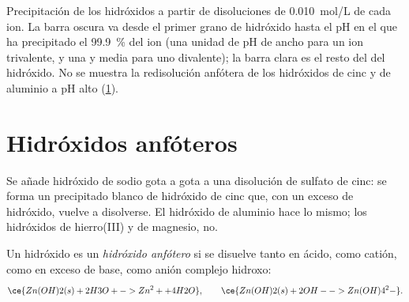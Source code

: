 \begin{omfigure}

{\small Precipitación de los hidróxidos a partir de disoluciones de
\qty{0.010}{mol/L} de cada ion. La barra oscura va desde el primer grano
de hidróxido hasta el pH en el que ha precipitado el
\qty{99.9}{\percent} del ion (una unidad de pH de ancho para un ion
trivalente, y una y media para uno divalente); la barra clara es el resto
del  del hidróxido. No se muestra la redisolución
anfótera de los hidróxidos de cinc y de aluminio a pH alto
(\cref{sec:b1:precipitation:amphoteric}).}
\end{omfigure}

\section{Hidróxidos anfóteros}\label{sec:b1:precipitation:amphoteric}

Se añade hidróxido de sodio gota a gota a una disolución de sulfato de
cinc: se forma un precipitado blanco de hidróxido de cinc que, con un
exceso de hidróxido, vuelve a disolverse. El hidróxido de aluminio hace
lo mismo; los hidróxidos de hierro(III) y de magnesio, no.

\begin{definition}\label{def:b1:precipitation:amphoteric-hydroxide}
Un hidróxido es un \emph{hidróxido anfótero}
si se disuelve tanto en ácido, como catión, como en exceso de base, como
anión complejo hidroxo:
\[
  \ce{Zn(OH)2(s) + 2H3O+ -> Zn^2+ + 4H2O}, \qquad
  \ce{Zn(OH)2(s) + 2OH- -> Zn(OH)4^2-} .
\]
\end{definition}

